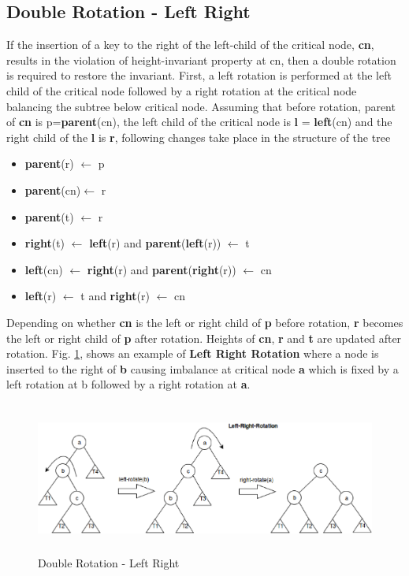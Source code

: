 \documentclass[MTech]{iitmdiss}
\begin{document}
\subsection*{Double Rotation - Left Right}
If the insertion of a key to the right of the left-child of the critical node, \textbf{cn}, results in the violation of height-invariant property at cn, then a double rotation is required to restore the invariant. First, a left rotation is performed at the left child of the critical node followed by a right rotation at the critical node balancing the subtree below critical node. Assuming that before rotation, parent of \textbf{cn} is p=\textbf{parent}(cn), the left child of the critical node is \textbf{l} = \textbf{left}(cn) and the right child of the \textbf{l} is \textbf{r}, following changes take place in the structure of the tree
\begin{itemize}
\item \textbf{parent}(r) $\leftarrow$ p
\item \textbf{parent}(cn)$\leftarrow$ r
\item \textbf{parent}(t) $\leftarrow$ r
\item \textbf{right}(t) $\leftarrow$ \textbf{left}(r) \hspace*{5mm} and  \textbf{parent}(\textbf{left}(r)) $\leftarrow$ t
\item \textbf{left}(cn) $\leftarrow$ \textbf{right}(r) \hspace*{5mm} and 
\textbf{parent}(\textbf{right}(r)) $\leftarrow$ cn
\item \textbf{left}(r) $\leftarrow$ t \hspace*{5mm} and \textbf{right}(r) $\leftarrow$ cn 
\end{itemize}
Depending on whether \textbf{cn} is the left or right child of \textbf{p} before rotation, \textbf{r} becomes the left or right child of \textbf{p} after rotation. Heights of \textbf{cn}, \textbf{r} and \textbf{t} are updated after rotation. Fig. \ref{fig:left_right}, shows an example of \textbf{Left Right Rotation} where a node is inserted to the right of \textbf{b} causing imbalance at critical node \textbf{a} which is fixed by a left rotation at b followed by a right rotation at \textbf{a}.   

\begin{figure}
\centering
\includegraphics[width=15cm, height=5cm]{Left-Right}
\caption{Double Rotation - Left Right}
\label{fig:left_right}
\end{figure}
\end{document}
